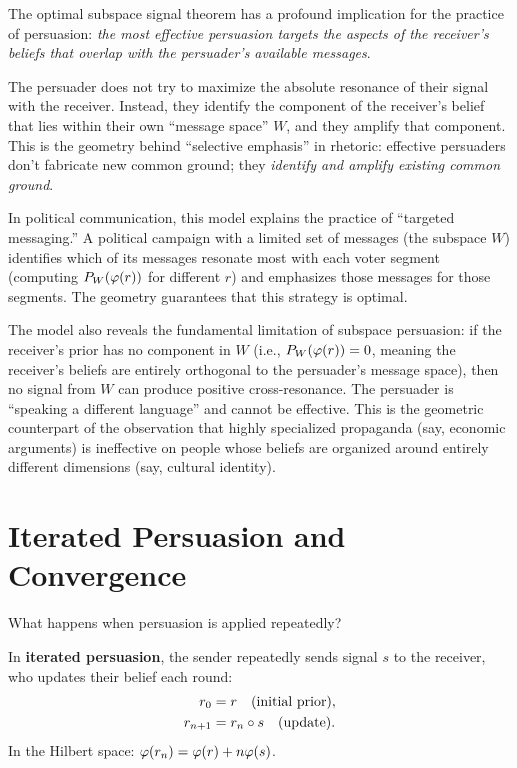 \begin{interpretation}
\label{interp:selective}
The optimal subspace signal theorem has a profound implication for the practice
of persuasion: \emph{the most effective persuasion targets the aspects of the
receiver's beliefs that overlap with the persuader's available messages}.

The persuader does not try to maximize the absolute resonance of their signal
with the receiver. Instead, they identify the component of the receiver's
belief that lies within their own ``message space'' $W$, and they amplify that
component. This is the geometry behind ``selective emphasis'' in rhetoric:
effective persuaders don't fabricate new common ground; they \emph{identify
and amplify existing common ground}.

In political communication, this model explains the practice of ``targeted
messaging.'' A political campaign with a limited set of messages (the subspace
$W$) identifies which of its messages resonate most with each voter segment
(computing $P_W(\varphi(r))$ for different $r$) and emphasizes those messages
for those segments. The geometry guarantees that this strategy is optimal.

The model also reveals the fundamental limitation of subspace persuasion: if the
receiver's prior has no component in $W$ (i.e., $P_W(\varphi(r)) = 0$, meaning
the receiver's beliefs are entirely orthogonal to the persuader's message
space), then no signal from $W$ can produce positive cross-resonance. The
persuader is ``speaking a different language'' and cannot be effective. This is
the geometric counterpart of the observation that highly specialized propaganda
(say, economic arguments) is ineffective on people whose beliefs are organized
around entirely different dimensions (say, cultural identity).
\end{interpretation}


\section{Iterated Persuasion and Convergence}

What happens when persuasion is applied repeatedly?

\begin{definition}
\label{def:iterated}
In \textbf{iterated persuasion}, the sender repeatedly sends signal $s$ to the
receiver, who updates their belief each round:
\begin{align*}
  r_0 &= r \quad \text{(initial prior)}, \\
  r_{n+1} &= r_n \circ s \quad \text{(update)}.
\end{align*}
In the Hilbert space: $\varphi(r_n) = \varphi(r) + n \varphi(s)$.
\end{definition}

